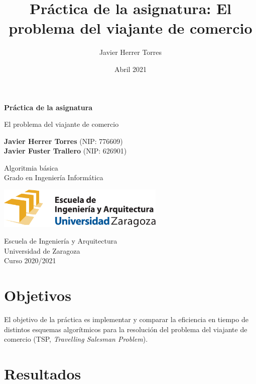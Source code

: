 \documentclass{article}
\title{Práctica de la asignatura: El problema del viajante de comercio}
\author{Javier Herrer Torres}
\date{Abril 2021}
\begin{document}
\begin{titlepage}
    \begin{center}
        \vspace*{1cm}
            
        \Huge
        \textbf{Práctica de la asignatura}
            
        \vspace{0.5cm}
        \LARGE
        El problema del viajante de comercio
            
        \vspace{1.5cm}
            
        \textbf{Javier Herrer Torres} (NIP: 776609)\\
        \textbf{Javier Fuster Trallero} (NIP: 626901)
            
        \vfill
            
        Algoritmia básica\\
        Grado en Ingeniería Informática\\
            
        \vspace{1.5cm}
            
        \includegraphics[width=0.6\textwidth]{../images/eina}
            
        \vspace{1.5cm}
            
        \Large
        Escuela de Ingeniería y Arquitectura\\
        Universidad de Zaragoza\\
        Curso 2020/2021
            
    \end{center}
\end{titlepage}

\section{Objetivos}
El objetivo de la práctica es implementar y comparar la eficiencia en tiempo de
distintos esquemas algorítmicos para la resolución del problema del viajante de
comercio (TSP, \textit{Travelling Salesman Problem}).

\section{Resultados}
\end{document}
